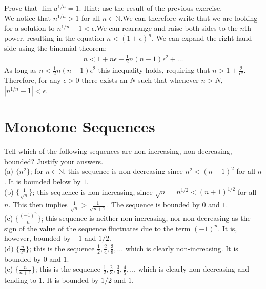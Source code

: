 \documentclass[12pt]{book}
\newcommand{\N}{\mathbb{N}}
\newenvironment{exercise}[2][Exercise]{\begin{trivlist}
\item[\hskip \labelsep {\bfseries #1}\hskip \labelsep {\bfseries #2.}]}{\end{trivlist}}
\begin{document}
\begin{exercise}{2.3.12}
Prove that $\lim a^{1/n} = 1$. Hint: use the result of the previous exercise.\\

We notice that $n^{1/n} > 1$ for all $n \in \N$.We can therefore write that we are looking for a solution to $n^{1/n} - 1 < \epsilon$.We can rearrange and raise both sides to the $n$th power, resulting in the equation $n < (1 + \epsilon)^n$. We can expand the right hand side using the binomial theorem:
	\begin{align*}
	n < 1+ n \epsilon + \frac{1}{2}n(n-1) \epsilon^2 + \hdots
	\end{align*}
As long as $n < \frac{1}{2} n(n-1) \epsilon^2$ this inequality holds, requiring that $n> 1+ \frac{2}{\epsilon^2}$. Therefore, for any $\epsilon >0$ there exists an $N$ such that whenever $n>N$,  $| n^{1/n} -1|< \epsilon$.
\end{exercise}


\section{Monotone Sequences}

\begin{exercise}{2.4.1}
Tell which of the following sequences are non-increasing, non-decreasing, bounded? Justify your answers.\\
(a) $\{n^2\}$; for $n \in \N$, this sequence is non-decreasing since $n^2 < (n+1)^2$ for all $n$. It is bounded below by $1$.\\
(b) $\{ \frac{1}{\sqrt{n}} \}$; this sequence is non-increasing, since $\sqrt{n}=n^{1/2}<(n+1)^{1/2}$ for all $n$. This then implies $\frac{1}{\sqrt{n}} > \frac{1}{\sqrt{n+1}}$. The sequence is bounded by $0$ and $1$. \\
(c) $\{ \frac{(-1)^n}{n} \}$;  this sequence is neither non-increasing, nor non-decreasing as the sign of the value of the sequence fluctuates due to the term $(-1)^n$. It is, however, bounded by $-1$ and $1/2$.\\
(d) $\{ \frac{n}{2^n} \}$; this is the sequence $\frac{1}{2},\frac{2}{4},\frac{3}{8},\hdots$ which is clearly non-increasing. It is bounded by $0$ and $1$. \\
(e) $\{ \frac{n}{n+1} \}$; this is the sequence $\frac{1}{2}, \frac{2}{3},\frac{3}{4},\frac{4}{5},\hdots$ which is clearly non-decreasing and tending to $1$. It is bounded by $1/2$ and $1$.
\end{exercise}
\end{document}
